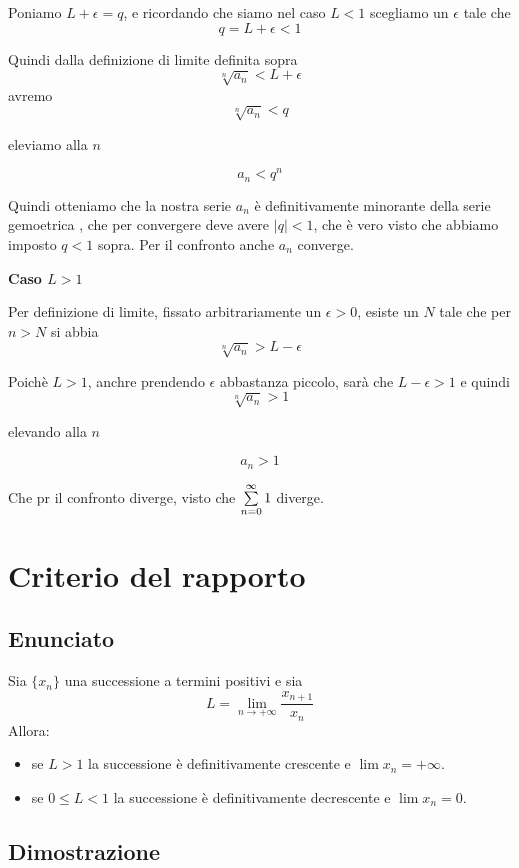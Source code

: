 Poniamo $L+\epsilon = q$, e ricordando che siamo nel caso $L<1$ scegliamo un $\epsilon$ tale che $$q = L+\epsilon < 1$$

Quindi dalla definizione di limite definita sopra $$\sqrt[n]{a_n} < L+\epsilon$$ avremo $$\sqrt[n]{a_n} < q$$

eleviamo alla $n$

$$a_n < q^n$$

Quindi otteniamo che la nostra serie $a_n$ è definitivamente minorante della serie gemoetrica , che per convergere deve avere $|q|<1$, che è vero visto che abbiamo imposto $q < 1$ sopra. Per il confronto anche $a_n$ converge.

\textbf{Caso $L>1$}

Per definizione di limite, fissato arbitrariamente un $\epsilon>0$, esiste un $N$ tale che per $n>N$ si abbia $$\sqrt[n]{a_n} > L-\epsilon$$

Poichè $L>1$, anchre prendendo $\epsilon$ abbastanza piccolo, sarà che $L-\epsilon>1$ e quindi
$$\sqrt[n]{a_n} > 1$$

elevando alla $n$

$$a_n > 1$$

Che pr il confronto diverge, visto che $\sum\limits_{n=0}^{\infty}1$ diverge.

\section{Criterio del rapporto}

\subsection{Enunciato}

Sia $\{x_n\}$ una successione a termini positivi e sia 
\begin{equation*}
L = \lim_{n \to +\infty} \frac{x_{n+1}}{x_n}
\end{equation*}
Allora:
\begin{itemize}
\item se $L > 1$ la successione è definitivamente crescente e $\lim x_n = +\infty$.
\item se $0 \le L < 1$ la successione è definitivamente decrescente e $\lim x_n = 0$.
\end{itemize}

\subsection{Dimostrazione}

